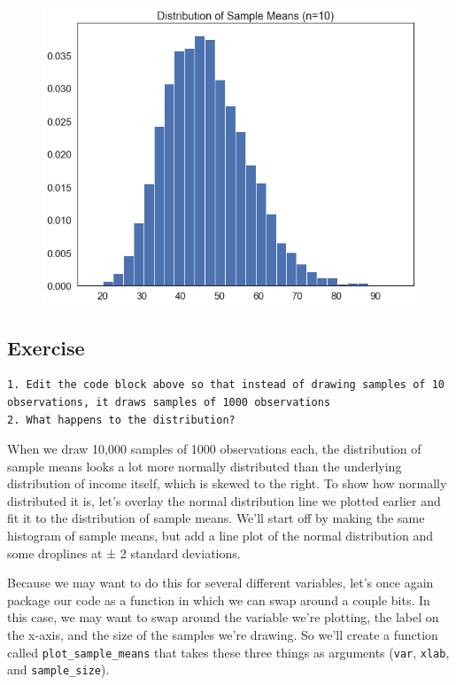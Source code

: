 \documentclass[
  letterpaper,
  DIV=11,
  numbers=noendperiod]{scrreprt}
\begin{document}
\begin{figure}[H]

{\centering \includegraphics{notebooks/W07. Distributions and Basic Statistics_files/figure-pdf/cell-24-output-1.png}

}

\end{figure}

\hypertarget{exercise-22}{%
\subsection{Exercise}\label{exercise-22}}

\begin{verbatim}
1. Edit the code block above so that instead of drawing samples of 10 observations, it draws samples of 1000 observations
2. What happens to the distribution?
\end{verbatim}

When we draw 10,000 samples of 1000 observations each, the distribution
of sample means looks a lot more normally distributed than the
underlying distribution of income itself, which is skewed to the right.
To show how normally distributed it is, let's overlay the normal
distribution line we plotted earlier and fit it to the distribution of
sample means. We'll start off by making the same histogram of sample
means, but add a line plot of the normal distribution and some droplines
at ± 2 standard deviations.

Because we may want to do this for several different variables, let's
once again package our code as a function in which we can swap around a
couple bits. In this case, we may want to swap around the variable we're
plotting, the label on the x-axis, and the size of the samples we're
drawing. So we'll create a function called \texttt{plot\_sample\_means}
that takes these three things as arguments (\texttt{var}, \texttt{xlab},
and \texttt{sample\_size}).
\end{document}
